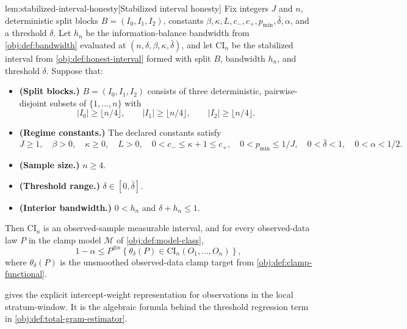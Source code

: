 \begin{lemmav}{lem:stabilized-interval-honesty}[Stabilized interval honesty]
Fix integers \(J\) and \(n\), deterministic split blocks \(B=(I_0,I_1,I_2)\), constants \(\beta,\kappa,L,c_-,c_+,p_{\min},\bar\delta,\alpha\), and a threshold \(\delta\).  Let \(h_n\) be the information-balance bandwidth from \cref{obj:def:bandwidth} evaluated at \((n,\delta,\beta,\kappa,\bar\delta)\), and let \(\mathrm{CI}_n\) be the stabilized interval from \cref{obj:def:honest-interval} formed with split \(B\), bandwidth \(h_n\), and threshold \(\delta\).  Suppose that:
\begin{itemize}
\item \textbf{(Split blocks.)} \(B=(I_0,I_1,I_2)\) consists of three deterministic, pairwise-disjoint subsets of \(\{1,\ldots,n\}\) with
\[
|I_0|\ge \lfloor n/4\rfloor,\qquad
|I_1|\ge \lfloor n/4\rfloor,\qquad
|I_2|\ge \lfloor n/4\rfloor .
\]
\item \textbf{(Regime constants.)} The declared constants satisfy
\[
J\ge 1,\quad
\beta>0,\quad
\kappa\ge 0,\quad
L>0,\quad
0<c_-\le \kappa+1\le c_+,\quad
0<p_{\min}\le 1/J,\quad
0<\bar\delta<1,\quad
0<\alpha<1/2 .
\]
\item \textbf{(Sample size.)} \(n\ge 4\).
\item \textbf{(Threshold range.)} \(\delta\in[0,\bar\delta]\).
\item \textbf{(Interior bandwidth.)} \(0<h_n\) and \(\delta+h_n\le 1\).
\end{itemize}
Then \(\mathrm{CI}_n\) is an observed-sample measurable interval, and for every observed-data law \(P\) in the clamp model \(\mathcal M\) of \cref{obj:def:model-class},
\[
1-\alpha
\le
P^{\otimes n}\!\left\{
\theta_\delta(P)\in \mathrm{CI}_n(O_1,\ldots,O_n)
\right\},
\]
where \(\theta_\delta(P)\) is the unsmoothed observed-data clamp target from \cref{obj:def:clamp-functional}.
\end{lemmav}

 gives the explicit intercept-weight representation for observations in the local stratum-window. It is the algebraic formula behind the threshold regression term in \cref{obj:def:total-gram-estimator}.

